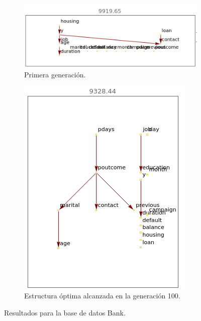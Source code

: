 \documentclass[10pt,a4paper]{article}
\begin{document}
\begin{figure}[htb!]
\begin{subfigure}[b]{0.475\textwidth}
            \includegraphics[width=\textwidth]{img/bank/first.png}
            \caption[ ]{{Primera generación.}}
        \end{subfigure}
        \hfill
        \begin{subfigure}[b]{0.475\textwidth}
            \centering 
            \includegraphics[width=\textwidth]{img/bank/best.png}
            \caption[ ]{{Estructura óptima alcanzada en la generación 100.}}
        \end{subfigure}

\caption{Resultados para la base de datos Bank.}
\label{fig:bank_results}
\end{figure}
\end{document}
